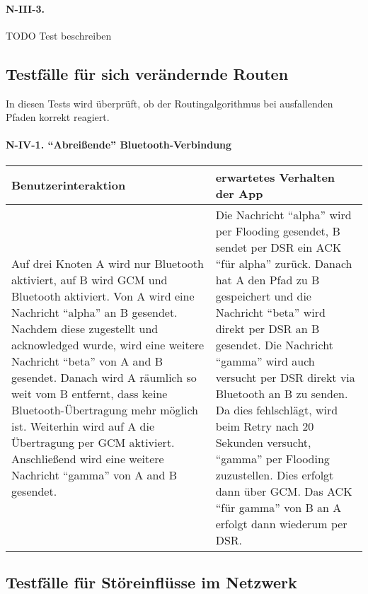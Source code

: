 \paragraph{N-III-3.}\label{section}

TODO Test beschreiben


\clearpage
\subsection{Testfälle für sich verändernde
Routen}\label{iv-testfuxe4lle-fuxfcr-sich-veruxe4ndernde-routen}

In diesen Tests wird überprüft, ob der Routingalgorithmus bei
ausfallenden Pfaden korrekt reagiert.

\paragraph{\texorpdfstring{N-IV-1. ``Abreißende''
Bluetooth-Verbindung}{N-IV-1. Abreißende Bluetooth-Verbindung}}\label{abreiuxdfende-bluetooth-verbindung}

\begin{longtable}{p{8cm}p{8.5cm}}
\toprule
Benutzerinteraktion & erwartetes Verhalten der App\tabularnewline
\midrule
\endhead
Auf drei Knoten A wird nur Bluetooth aktiviert, auf B wird GCM und
Bluetooth aktiviert. Von A wird eine Nachricht ``alpha'' an B gesendet.
Nachdem diese zugestellt und acknowledged wurde, wird eine weitere
Nachricht ``beta'' von A and B gesendet. Danach wird A räumlich so weit
vom B entfernt, dass keine Bluetooth-Übertragung mehr möglich ist.
Weiterhin wird auf A die Übertragung per GCM aktiviert. Anschließend
wird eine weitere Nachricht ``gamma'' von A and B gesendet. & Die
Nachricht ``alpha'' wird per Flooding gesendet, B sendet per DSR ein ACK
``für alpha'' zurück. Danach hat A den Pfad zu B gespeichert und die
Nachricht ``beta'' wird direkt per DSR an B gesendet. Die Nachricht
``gamma'' wird auch versucht per DSR direkt via Bluetooth an B zu
senden. Da dies fehlschlägt, wird beim Retry nach 20 Sekunden versucht,
``gamma'' per Flooding zuzustellen. Dies erfolgt dann über GCM. Das ACK
``für gamma'' von B an A erfolgt dann wiederum per DSR.\tabularnewline
\bottomrule
\end{longtable}

\clearpage
\subsection{Testfälle für Störeinflüsse im
Netzwerk}\label{v-testfuxe4lle-fuxfcr-stuxf6reinfluxfcsse-im-netzwerk}


